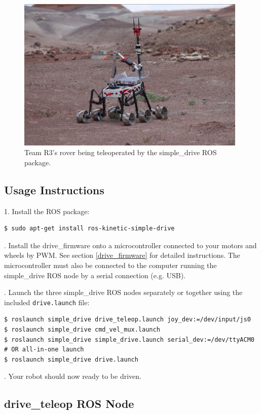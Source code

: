 \documentclass[runningheads,a4paper]{llncs}
\begin{document}
\begin{figure}
\centering
\includegraphics[width=11cm]{rover_simple_drive}
\caption{Team R3's rover being teleoperated by the simple\_drive ROS package.}
\label{fig:rover_simple_drive}
\end{figure}

\subsection{Usage Instructions}

1. Install the ROS package:
\begin{lstlisting}[frame=single,basicstyle=\ttfamily\footnotesize]
$ sudo apt-get install ros-kinetic-simple-drive
\end{lstlisting}

. Install the drive\_firmware onto a microcontroller connected to your motors and wheels by PWM. See section \ref{drive_firmware} for detailed instructions. The microcontroller must also be connected to the computer running the simple\_drive ROS node by a serial connection (e.g. USB).

. Launch the three simple\_drive ROS nodes separately or together using the included \texttt{drive.launch} file:
\begin{lstlisting}[frame=single,basicstyle=\ttfamily\footnotesize]
$ roslaunch simple_drive drive_teleop.launch joy_dev:=/dev/input/js0
$ roslaunch simple_drive cmd_vel_mux.launch
$ roslaunch simple_drive simple_drive.launch serial_dev:=/dev/ttyACM0
# OR all-in-one launch
$ roslaunch simple_drive drive.launch
\end{lstlisting}

. Your robot should now ready to be driven.

\subsection{drive\_teleop ROS Node}
\end{document}
